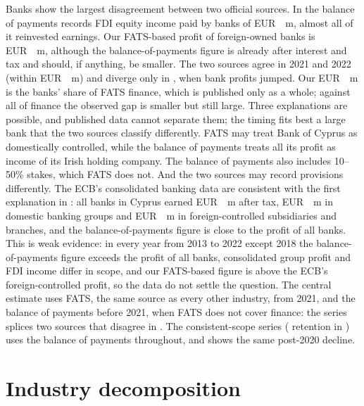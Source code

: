 \documentclass[11pt]{article}
\newcommand{\EUR}{EUR~}
\begin{document}
Banks show the largest disagreement between two official sources.
In \LastYear{} the balance of payments records FDI equity income paid by banks of \EUR\BankBopLast~m, almost all of it reinvested earnings.
Our FATS-based profit of foreign-owned banks is \EUR\BankFatsLast~m, although the balance-of-payments figure is already after interest and tax and should, if anything, be smaller.
The two sources agree in 2021 and 2022 (within \EUR\BankAgreeGap~m) and diverge only in \LastYear{}, when bank profits jumped.
Our \EUR\BankFatsLast~m is the banks' share of FATS finance, which is published only as a whole; against all of finance the observed gap is smaller but still large.
Three explanations are possible, and published data cannot separate them; the timing fits best a large bank that the two sources classify differently.
FATS may treat Bank of Cyprus as domestically controlled, while the balance of payments treats all its profit as income of its Irish holding company.
The balance of payments also includes 10--50\% stakes, which FATS does not.
And the two sources may record provisions differently.
The ECB's consolidated banking data are consistent with the first explanation in \LastYear{}: all banks in Cyprus earned \EUR\ECBBankAllLast~m after tax, \EUR\ECBBankDomLast~m in domestic banking groups and \EUR\ECBBankForLast~m in foreign-controlled subsidiaries and branches, and the balance-of-payments figure is close to the profit of all banks.
This is weak evidence: in every year from 2013 to 2022 except 2018 the balance-of-payments figure exceeds the profit of all banks, consolidated group profit and FDI income differ in scope, and our FATS-based figure is above the ECB's foreign-controlled profit, so the data do not settle the question.
The central estimate uses FATS, the same source as every other industry, from 2021, and the balance of payments before 2021, when FATS does not cover finance: the series splices two sources that disagree in \LastYear{}.
The consistent-scope series (\DVRConsLast{} retention in \LastYear{}) uses the balance of payments throughout, and shows the same post-2020 decline.

\section{Industry decomposition}
\label{sec:industry}


\end{document}
